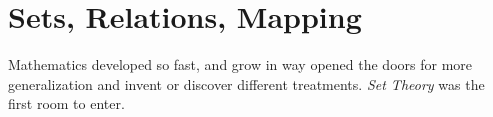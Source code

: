 \section{Sets, Relations, Mapping}
Mathematics developed so fast, and grow in way opened the doors for more generalization and invent or discover different treatments. {\it Set Theory} was the first room to enter.
